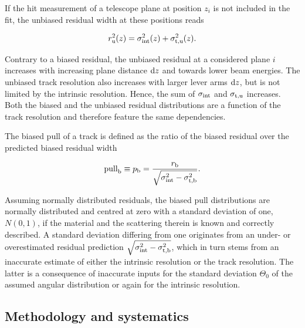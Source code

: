 If the hit measurement of a telescope plane at position $z_i$ is not included in the fit,
 the \textrm{unbiased} residual width at these positions reads~\cite{ref:eudetreport200902}
 
\begin{equation}
r_{\textrm{u}}^2(z) = \sigma_{\textrm{int}}^2(z) + \sigma_{\textrm{t,u}}^2(z).
\label{eq:telescoperesolutionequation2} 
\end{equation}

\noindent
Contrary to a biased residual, the unbiased residual at a considered plane $i$ increases with increasing plane distance $\textrm{d}z$ and towards lower beam energies. 
The unbiased track resolution also increases with larger lever arms $\textrm{d}z$, but is not limited by the intrinsic resolution. 
Hence, the sum of $\sigma_{\textrm{int}}$ and $\sigma_{\textrm{t,u}}$ increases. 
Both the biased and the unbiased residual distributions are a function of the track resolution and therefore feature the same dependencies.

The biased pull of a track is defined as the ratio of the biased residual over the predicted biased residual width

\begin{equation}
 \textrm{pull}_{\textrm{b}} \equiv p_{\textrm{b}} = \frac{r_{\textrm{b}}}{\sqrt{\sigma_{\textrm{int}}^2 - \sigma_{\textrm{t,b}}^2}}.
 \label{eq:pull}
\end{equation}

\noindent
Assuming normally distributed residuals, the biased pull distributions are normally distributed and centred at zero with a standard deviation of one, $N(0,1)$,
 if the material and the scattering therein is known and correctly described. 
A standard deviation differing from one originates from an under- or overestimated residual prediction $\sqrt{\sigma_{\textrm{int}}^2 - \sigma_{\textrm{t,b}}^2}$,
 which in turn stems from an inaccurate estimate of either the intrinsic resolution or the track resolution. 
The latter is a consequence of inaccurate inputs for the standard deviation $\Theta_0$ of the assumed angular distribution or again for the intrinsic resolution. 


\subsection{Methodology and systematics}
\label{sec:meth}

